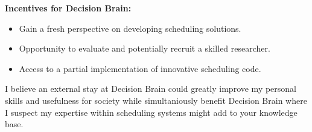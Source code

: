 \textbf{Incentives for Decision Brain:} 
\begin{itemize} 
	\item Gain a fresh perspective on developing scheduling solutions. 
	\item Opportunity to evaluate and potentially recruit a skilled researcher. 
	\item Access to a partial implementation of innovative scheduling code.
\end{itemize}

I believe an external stay at Decision Brain could greatly improve my personal skills and usefulness for society
while simultaniously benefit Decision Brain where I suspect my expertise within scheduling systems might add to your knowledge base.
